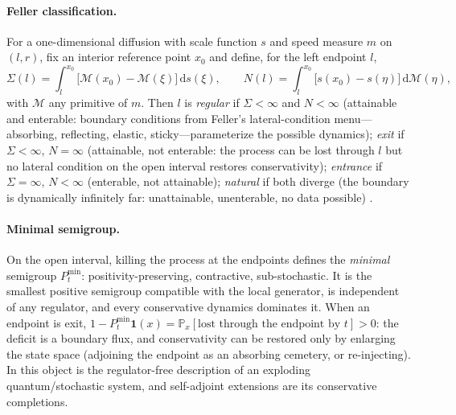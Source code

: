 \documentclass[11pt]{article}
\theoremstyle{definition}
\theoremstyle{remark}
\newcommand{\dd}{\mathrm{d}}
\begin{document}
\paragraph{Feller classification.} For a one-dimensional diffusion
with scale function $s$ and speed measure $m$ on $(l,r)$, fix an
interior reference point $x_{0}$ and define, for the left endpoint
$l$,
\begin{equation}
\Sigma(l)=\int_{l}^{x_{0}}\bigl[\mathcal{M}(x_{0})-\mathcal{M}(\xi)\bigr]\,\dd s(\xi),
\qquad
N(l)=\int_{l}^{x_{0}}\bigl[s(x_{0})-s(\eta)\bigr]\,\dd \mathcal{M}(\eta),
\label{eq:sigmaN}
\end{equation}
with $\mathcal{M}$ any primitive of $m$. Then $l$ is \emph{regular} if
$\Sigma<\infty$ and $N<\infty$ (attainable and enterable: boundary
conditions from Feller's lateral-condition menu---absorbing,
reflecting, elastic, sticky---parameterize the possible dynamics);
\emph{exit} if $\Sigma<\infty$, $N=\infty$ (attainable, not
enterable: the process can be lost through $l$ but no lateral
condition on the open interval restores conservativity);
\emph{entrance} if $\Sigma=\infty$, $N<\infty$ (enterable, not
attainable); \emph{natural} if both diverge (the boundary is
dynamically infinitely far: unattainable, unenterable, no data
possible) \cite{Feller1952,ItoMcKean,KarlinTaylor}.

\paragraph{Minimal semigroup.} On the open interval, killing the
process at the endpoints defines the \emph{minimal} semigroup
$P^{\min}_{t}$: positivity-preserving, contractive, sub-stochastic. It
is the smallest positive semigroup compatible with the local
generator, is independent of any regulator, and every conservative
dynamics dominates it. When an endpoint is exit,
$1-P^{\min}_{t}\mathbf{1}(x)=\mathbb{P}_{x}[\text{lost through the
endpoint by }t]>0$: the deficit is a boundary flux, and
conservativity can be restored only by enlarging the state space
(adjoining the endpoint as an absorbing cemetery, or re-injecting).
In \cite{indivisible} this object is the regulator-free description of
an exploding quantum/stochastic system, and self-adjoint extensions
are its conservative completions.
\end{document}
